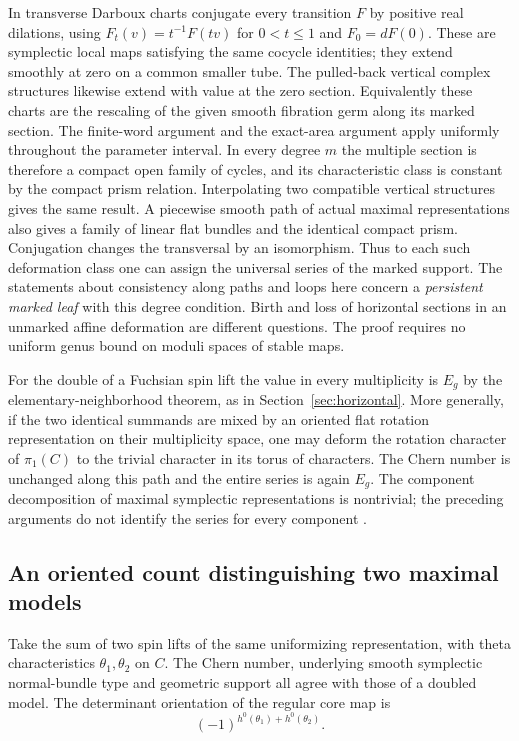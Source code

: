 In transverse Darboux charts conjugate every transition \(F\) by positive real dilations, using \(F_t(v)=t^{-1}F(tv)\) for \(0<t\le1\) and \(F_0=dF(0)\). These are symplectic local maps satisfying the same cocycle identities; they extend smoothly at zero on a common smaller tube. The pulled-back vertical complex structures likewise extend with value at the zero section. Equivalently these charts are the rescaling of the given smooth fibration germ along its marked section. The finite-word argument and the exact-area argument apply uniformly throughout the parameter interval. In every degree \(m\) the multiple section is therefore a compact open family of cycles, and its characteristic class is constant by the compact prism relation. Interpolating two compatible vertical structures gives the same result. A piecewise smooth path of actual maximal representations also gives a family of linear flat bundles and the identical compact prism. Conjugation changes the transversal by an isomorphism. Thus to each such deformation class one can assign the universal series of the marked support. The statements about consistency along paths and loops here concern a \emph{persistent marked leaf} with this degree condition. Birth and loss of horizontal sections in an unmarked affine deformation are different questions. The proof requires no uniform genus bound on moduli spaces of stable maps.

For the double of a Fuchsian spin lift the value in every multiplicity is \(E_g\) by the elementary-neighborhood theorem, as in Section~\ref{sec:horizontal}. More generally, if the two identical summands are mixed by an oriented flat rotation representation on their multiplicity space, one may deform the rotation character of \(\pi_1(C)\) to the trivial character in its torus of characters. The Chern number is unchanged along this path and the entire series is again \(E_g\). The component decomposition of maximal symplectic representations is nontrivial; the preceding arguments do not identify the series for every component \cite{gothen} \cite{gm}.

\subsection{An oriented count distinguishing two maximal models}

Take the sum of two spin lifts of the same uniformizing representation, with theta characteristics \(\theta_1,\theta_2\) on \(C\). The Chern number, underlying smooth symplectic normal-bundle type and geometric support all agree with those of a doubled model. The determinant orientation of the regular core map is
\[(-1)^{h^0(\theta_1)+h^0(\theta_2)} .\]

